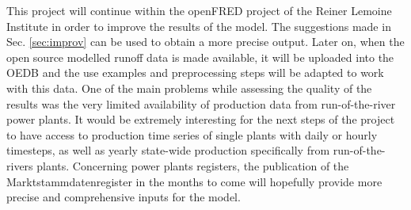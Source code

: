 This project will continue within the openFRED project of the Reiner Lemoine Institute in order to improve the results of the model. The suggestions made in Sec. \ref{sec:improv} can be used to obtain a more precise output. Later on, when the open source modelled runoff data is made available, it will be uploaded into the OEDB and the use examples and preprocessing steps will be adapted to work with this data.\newline
One of the main problems while assessing the quality of the results was the very limited availability of production data from run-of-the-river power plants. It would be extremely interesting for the next steps of the project to have access to production time series of single plants with daily or hourly timesteps, as well as yearly state-wide production specifically from run-of-the-rivers plants. Concerning power plants registers, the publication of the Marktstammdatenregister in the months to come will hopefully provide more precise and comprehensive inputs for the model.
